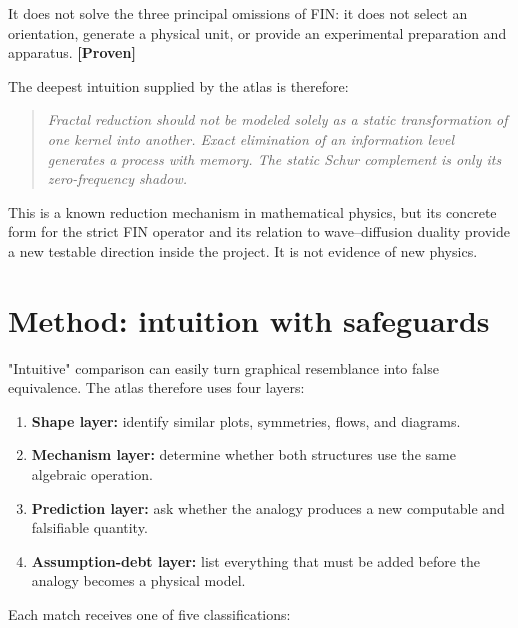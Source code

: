 \documentclass[11pt,a4paper,openany]{report}
\newcommand{\statusProven}{\textcolor{fingreen}{[Proven]}}
\begin{document}
It does not solve the three principal omissions of FIN: it does not select an orientation, generate a physical unit, or provide an experimental preparation and apparatus. \textbf{\statusProven{}}

The deepest intuition supplied by the atlas is therefore:

\begin{quote}\itshape
Fractal reduction should not be modeled solely as a static transformation of one kernel into another. Exact elimination of an information level generates a process with memory. The static Schur complement is only its zero-frequency shadow.

\end{quote}

This is a known reduction mechanism in mathematical physics, but its concrete form for the strict FIN operator and its relation to wave--diffusion duality provide a new testable direction inside the project. It is not evidence of new physics.

\chapter{Method: intuition with safeguards}

"Intuitive" comparison can easily turn graphical resemblance into false equivalence. The atlas therefore uses four layers:

\begin{enumerate}
\item 
\textbf{Shape layer:} identify similar plots, symmetries, flows, and diagrams.

\item 
\textbf{Mechanism layer:} determine whether both structures use the same algebraic operation.

\item 
\textbf{Prediction layer:} ask whether the analogy produces a new computable and falsifiable quantity.

\item 
\textbf{Assumption-debt layer:} list everything that must be added before the analogy becomes a physical model.

\end{enumerate}

Each match receives one of five classifications:
\end{document}

